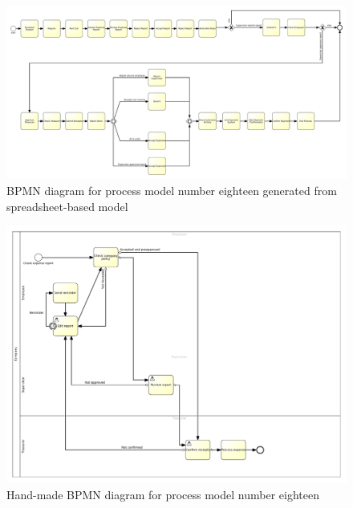 \begin{figure}[h!p]
\centering
\includegraphics[width=\hsize]{./generated_bpmn/model18.pdf}
\caption{BPMN diagram for process model number eighteen generated from spreadsheet-based model}
\label{bpmn:generated_model18_val}
\end{figure}

\begin{figure}[h!p]
	\centering
	\includegraphics[width=\hsize]{./bpmn/model18.pdf}
	\caption{Hand-made BPMN diagram for process model number eighteen}
	\label{bpmn:model18_val}
\end{figure}

